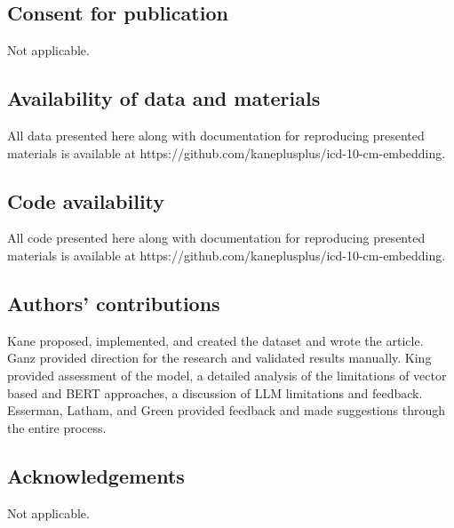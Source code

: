 \documentclass{bmcart}
\begin{document}
\begin{backmatter}
\subsection*{Consent for publication}

Not applicable.


\subsection*{Availability of data and materials}%

All data presented here along with documentation for 
reproducing presented materials is available at 
https://github.com/kaneplusplus/icd-10-cm-embedding.

\subsection*{Code availability}%

All code presented here along with documentation for 
reproducing presented materials is available at 
https://github.com/kaneplusplus/icd-10-cm-embedding.

\subsection*{Authors' contributions}

Kane proposed, implemented, and created the dataset and wrote the article. 
Ganz provided direction for the research and validated results manually. 
King provided assessment of the model, a detailed analysis of the limitations 
of vector based and BERT approaches, a discussion of LLM 
limitations and feedback.
Esserman, Latham, and Green provided feedback and made suggestions through the 
entire process. 

\subsection{Acknowledgements}

Not applicable.



\end{backmatter}
\end{document}
